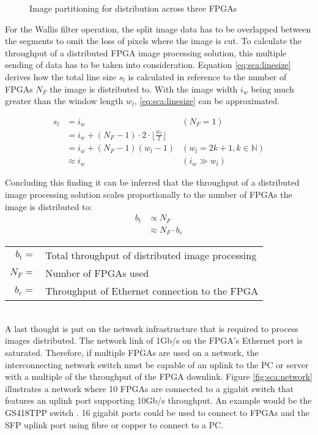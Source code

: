 \begin{figure}[b!]
    \centering
    \begin{adjustbox}{max width=\linewidth}
        
    \end{adjustbox}
    \caption{Image partitioning for distribution across three FPGAs}
    \label{fig:sca:acrossfpgapart}
\end{figure}

For the Wallis filter operation, the split image data has to be overlapped
between the
segments to omit the loss of pixels where the image is cut. To calculate the
throughput of a distributed FPGA image processing solution, this multiple
sending of data has to be taken into consideration. Equation 
\ref{eq:sca:linesize} derives how the total line size $s_l$ is calculated in
reference to the number of FPGAs $N_F$ the image is distributed to. With the
image width $i_w$ being much greater than the window length $w_l$, 
\ref{eq:sca:linesize} can be approximated.

\begin{align}
    s_l  & = i_w & (N_F = 1) \\
         & = i_w + (N_F-1) \cdot 2 \cdot \lfloor\frac{w_l}{2}\rfloor & \\
         & = i_w + (N_F-1)(w_l-1) & (w_l=2k+1, k \in \mathbb{N} )\\
         & \approx i_w & (i_w \gg w_l)
    \label{eq:sca:linesize}
\end{align}

Concluding this finding it can be inferred that the throughput of a distributed
image processing solution scales proportionally to the number of FPGAs the image
is distributed to:
\begin{align}
    b_t & \propto N_F \\
        & \approx N_F \cdot b_e
\end{align}
\begin{tabular}{rl}
    $b_t        =$ & Total throughput of distributed image processing \\
    $N_F        =$ & Number of FPGAs used \\
    $b_e        =$ & Throughput of Ethernet connection to the FPGA \\
\end{tabular} \\

A last thought is put on the network infrastructure that is required to
process images distributed. The network link of 1Gb/s on the FPGA's Ethernet
port is saturated. Therefore, if multiple FPGAs are used on a network, the
interconnecting network switch must be capable of an uplink to the PC or server
with a multiple of the throughput of the FPGA downlink. Figure 
\ref{fig:sca:network} illustrates a network where 10 FPGAs are connected to a
gigabit switch that features an uplink port supporting 10Gb/s throughput. An
example would be the GS418TPP switch \cite{netgearswitch}. 16 gigabit ports
could be used to connect to FPGAs and the SFP uplink port using fibre or copper
to connect to a PC.

